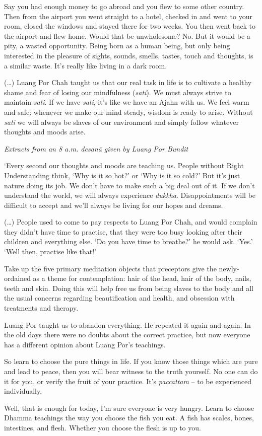 Say you had enough money to go abroad and you flew to some other
country. Then from the airport you went straight to a hotel, checked in
and went to your room, closed the windows and stayed there for two
weeks. You then went back to the airport and flew home. Would that be
unwholesome? No. But it would be a pity, a wasted opportunity. Being
born as a human being, but only being interested in the pleasure of
sights, sounds, smells, tastes, touch and thoughts, is a similar waste. 
It's really like living in a dark room. 

 (\ldots{}) Luang Por Chah taught us that our real task in life is to
cultivate a healthy shame and fear of losing our mindfulness
 (\emph{sati}). We must always strive to maintain \emph{sati}. If we have
\emph{sati}, it's like we have an Ajahn with us. We feel warm and safe: 
whenever we make our mind steady, wisdom is ready to arise. Without
\emph{sati} we will always be slaves of our environment and simply
follow whatever thoughts and moods arise. 

\emph{Extracts from an 8 a.m. desanā given by Luang Por Bundit}

`Every second our thoughts and moods are teaching us. People without
Right Understanding think, `Why is it so hot?' or `Why is it so cold?'
But it's just nature doing its job. We don't have to make such a big
deal out of it. If we don't understand the world, we will always
experience \emph{dukkha}. Disappointments will be difficult to accept
and we'll always be living for our hopes and dreams. 

 (\ldots{}) People used to come to pay respects to Luang Por Chah, and
would complain they didn't have time to practise, that they were too
busy looking after their children and everything else. `Do you have time
to breathe?' he would ask. `Yes.' `Well then, practise like that!'

Take up the five primary meditation objects that preceptors give the
newly-ordained as a theme for contemplation: hair of the head, hair of
the body, nails, teeth and skin. Doing this will help free us from being
slaves to the body and all the usual concerns regarding beautification
and health, and obsession with treatments and therapy. 

Luang Por taught us to abandon everything. He repeated it again and
again. In the old days there were no doubts about the correct practice, 
but now everyone has a different opinion about Luang Por's teachings. 

So learn to choose the pure things in life. If you know those things
which are pure and lead to peace, then you will bear witness to the
truth yourself. No one can do it for you, or verify the fruit of your
practice. It's \emph{paccattam} -- to be experienced individually. 

Well, that is enough for today, I'm sure everyone is very hungry. Learn
to choose Dhamma teachings the way you choose the fish you eat. A fish
has scales, bones, intestines, and flesh. Whether you choose the flesh
is up to you. 

